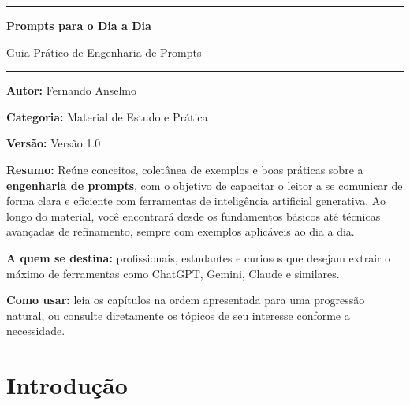 \documentclass[11pt, a4paper]{article}
\newcommand{\docTitle}{Prompts para o Dia a Dia}
\newcommand{\docSubtitle}{Guia Prático de Engenharia de Prompts}
\newcommand{\docAuthor}{Fernando Anselmo}
\newcommand{\docCategory}{Material de Estudo e Prática}
\newcommand{\docVersion}{Versão 1.0}
\begin{document}
	
\begingroup
\setlength{\parskip}{0pt}

{\color{secondary}\rule{\textwidth}{2pt}}

\vspace{0.3cm}

{\Huge\sffamily\bfseries\color{primary} \docTitle\par}

\vspace{0.2cm}

{\Large\sffamily\color{secondary} \docSubtitle\par}

\vspace{0.3cm}

{\color{secondary}\rule{\textwidth}{1.5pt}}

\endgroup

\textbf{Autor:} \docAuthor

\textbf{Categoria:} \docCategory

\textbf{Versão:} \docVersion

\textbf{Resumo:} Reúne conceitos, coletânea de exemplos e boas práticas sobre a \textbf{engenharia de prompts}, com o objetivo de capacitar o leitor a se comunicar de forma clara e eficiente com ferramentas de inteligência artificial generativa. Ao longo do material, você encontrará desde os fundamentos básicos até técnicas avançadas de refinamento, sempre com exemplos aplicáveis ao dia a dia.

\textbf{A quem se destina:} profissionais, estudantes e curiosos que desejam extrair o máximo de ferramentas como ChatGPT, Gemini, Claude e similares.

\textbf{Como usar:} leia os capítulos na ordem apresentada para uma progressão natural, ou consulte diretamente os tópicos de seu interesse conforme a necessidade.

\section*{Introdução}
\end{document}
